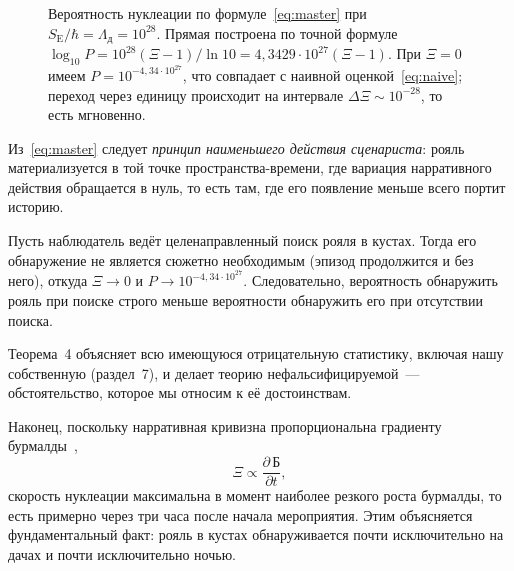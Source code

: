 \documentclass[11pt,a4paper]{article}
\newcommand{\Burm}{\text{Б}}
\newcommand{\Lnar}{\Lambda_{\text{д}}}
\begin{document}
\begin{figure}[htbp]
\centering
{}
\caption{Вероятность нуклеации по формуле~\eqref{eq:master} при $S_{\mathrm{E}}/\hbar = \Lnar = 10^{28}$. Прямая построена по точной формуле $\log_{10}P = 10^{28}(\Xi-1)/\ln 10 = 4{,}3429\cdot10^{27}(\Xi-1)$. При $\Xi = 0$ имеем $P = 10^{-4{,}34\cdot10^{27}}$, что совпадает с наивной оценкой~\eqref{eq:naive}; переход через единицу происходит на интервале $\Delta\Xi \sim 10^{-28}$, то есть мгновенно.}
\label{fig:master}
\end{figure}

Из~\eqref{eq:master} следует \emph{принцип наименьшего действия сценариста}: рояль материализуется в той точке пространства-времени, где вариация нарративного действия обращается в нуль, то есть там, где его появление меньше всего портит историю.

\begin{theorem}
Пусть наблюдатель ведёт целенаправленный поиск рояля в кустах. Тогда его обнаружение не является сюжетно необходимым (эпизод продолжится и без него), откуда $\Xi \to 0$ и $P \to 10^{-4{,}34\cdot10^{27}}$. Следовательно, вероятность обнаружить рояль при поиске строго меньше вероятности обнаружить его при отсутствии поиска.
\end{theorem}

Теорема~4 объясняет всю имеющуюся отрицательную статистику, включая нашу собственную (раздел~7), и делает теорию нефальсифицируемой~--- обстоятельство, которое мы относим к её достоинствам.

Наконец, поскольку нарративная кривизна пропорциональна градиенту бурмалды~\cite{burmalda},
\begin{equation}
\Xi \propto \frac{\partial\,\Burm}{\partial t},
\end{equation}
скорость нуклеации максимальна в момент наиболее резкого роста бурмалды, то есть примерно через три часа после начала мероприятия. Этим объясняется фундаментальный факт: рояль в кустах обнаруживается почти исключительно на дачах и почти исключительно ночью.
\end{document}
